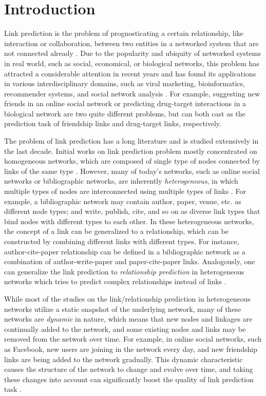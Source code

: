 \section{Introduction}\label{sec:intro}
Link prediction is the problem of prognosticating a certain relationship, like interaction or collaboration, between two entities in a networked system that are not connected already \cite{lu2011link}. Due to the popularity and ubiquity of networked systems in real world, such as social, economical, or biological networks, this problem has attracted a considerable attention in recent years and has found its applications in various interdisciplinary domains, such as viral marketing, bioinformatics, recommender systems, and social network analysis \cite{wasserman1994social}. For example, suggesting new friends in an online social network \cite{liben2007link} or predicting drug-target interactions in a biological network \cite{chen2012drug} are two quite different problems, but can both cast as the prediction task of friendship links and drug-target links, respectively.

The problem of link prediction has a long literature and is studied extensively in the last decade. Initial works on link prediction problem mostly concentrated on homogeneous networks, which are composed of single type of nodes connected by links of the same type \cite{liben2007link, wang2007local, lichtenwalter2010new}. However, many of today's networks, such as online social networks or bibliographic networks, are inherently \emph{heterogeneous}, in which multiple types of nodes are interconnected using multiple types of links \cite{taskar2004link, shi2017survey}. For example, a bibliographic network may contain author, paper, venue, etc. as different node types; and write, publish, cite, and so on as diverse link types that bind nodes with different types to each other. In these heterogeneous networks, the concept of a link can be generalized to a relationship, which can be constructed by combining different links with different types. For instance, author-cite-paper relationship can be defined in a bibliographic network as a combination of author-write-paper and paper-cite-paper links. Analogously, one can generalize the link prediction to \emph{relationship prediction} in heterogeneous networks which tries to predict complex relationships instead of links \cite{sun2012will}.

While most of the studies on the link/relationship prediction in heterogeneous networks utilize a static snapshot of the underlying network, many of these networks are \emph{dynamic} in nature, which means that new nodes and linkages are continually added to the network, and some existing nodes and links may be removed from the network over time. For example, in online social networks, such as Facebook, new users are joining in the network every day, and new friendship links are being added to the network gradually. This dynamic characteristic causes the structure of the network to change and evolve over time, and taking these changes into account can significantly boost the quality of link prediction task \cite{potgieter2009temporality}.

